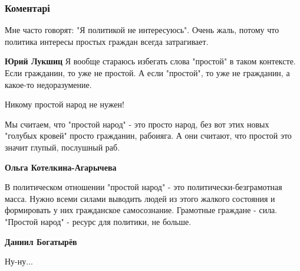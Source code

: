  
 
 
 
 
\subsubsection{Коментарі}
\label{sec:22_10_2021.fb.bogatyrev_daniil.1.prostoj_narod.cmt}

\begin{itemize} %
Мне часто говорят: "Я политикой не интересуюсь". Очень жаль, потому что политика интересы простых граждан всегда затрагивает.

\begin{itemize} %
\textbf{Юрий Лукшиц} Я вообще стараюсь избегать слова "простой" в таком контексте. Если гражданин, то уже не простой. А если "простой", то уже не гражданин, а какое-то недоразумение.
\end{itemize} %

Никому простой народ не нужен!


Мы считаем, что "простой народ" - это просто народ, без вот этих новых "голубых
кровей" просто гражданин, рабоияга. А они считают, что простой это значит
глупый, послушный раб.

\begin{itemize} %
\textbf{Ольга Котелкина-Агарычева} 

В политическом отношении "простой народ" - это политически-безграмотная масса.
Нужно всеми силами выводить людей из этого жалкого состояния и формировать у
них гражданское самосознание. Грамотные граждане - сила. "Простой народ" -
ресурс для политики, не больше.


\textbf{Даниил Богатырёв}


Ну-ну...


\end{itemize}
\end{itemize}
